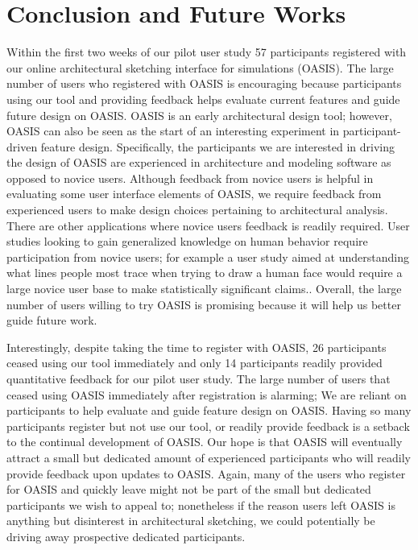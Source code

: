 \chapter{Conclusion and Future Works} \label{sec:con}

	Within the first two weeks of our pilot user study  57 participants registered with our online architectural sketching interface for simulations (OASIS).
	The large number of users who registered with OASIS is encouraging because participants using our tool and providing feedback helps evaluate current features and guide future design on OASIS.
	OASIS is an early architectural design tool; however, OASIS can also be seen as the start of an interesting experiment in participant-driven feature design.
	Specifically, the participants we are interested in driving the design of OASIS are experienced in architecture and modeling software as opposed to novice users.
	Although feedback from novice users is helpful in evaluating some user interface elements of OASIS, we require feedback from experienced users to make design choices pertaining to architectural analysis.       
	There are other applications where novice users feedback is readily required.
	User studies looking to gain generalized knowledge on human behavior require participation from novice users;
	for example a user study aimed at understanding what lines people most trace when trying to draw a human face would require a large novice user base to make statistically significant claims.\cite{limpaecher2013real}.
	Overall, the large number of users willing to try OASIS is promising because it will help us better guide future work.

	Interestingly, despite taking the time to register with OASIS, 26 participants ceased using our tool immediately and only 14 participants readily provided quantitative feedback for our pilot user study.
	The large number of users that ceased using OASIS immediately after registration is alarming;
	We are reliant on participants to help evaluate and guide feature design on OASIS.
	Having so many participants register but not use our tool, or readily provide feedback is a setback to the continual development of OASIS.
	Our hope is that OASIS will eventually attract a small but dedicated amount of experienced participants who will readily provide feedback upon updates to OASIS.
	Again, many of the users who register for OASIS and quickly leave might not be part of the small but dedicated participants we wish to appeal to;
	nonetheless if the reason users left OASIS is anything but disinterest in architectural sketching, we could potentially be driving away prospective dedicated participants.

